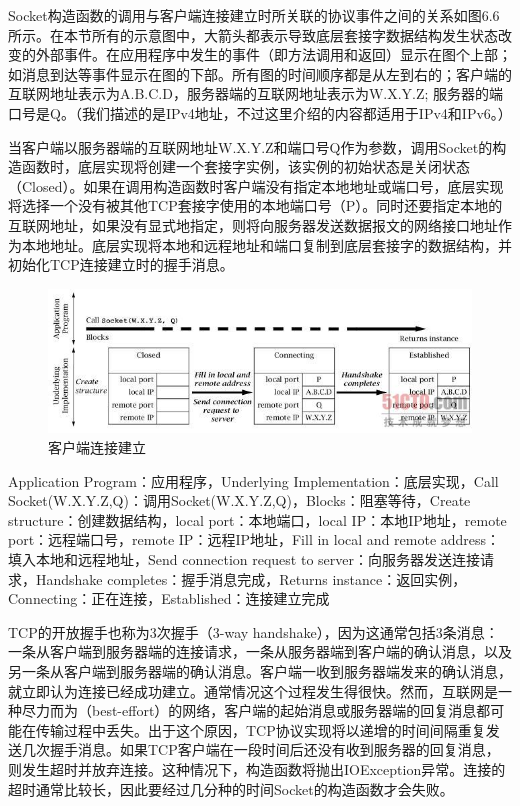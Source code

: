 		Socket构造函数的调用与客户端连接建立时所关联的协议事件之间的关系如图6.6所示。在本节所有的示意图中，大箭头都表示导致底层套接字数据结构发生状态改变的外部事件。在应用程序中发生的事件（即方法调用和返回）显示在图个上部；如消息到达等事件显示在图的下部。所有图的时间顺序都是从左到右的；客户端的互联网地址表示为A.B.C.D，服务器端的互联网地址表示为W.X.Y.Z; 服务器的端口号是Q。（我们描述的是IPv4地址，不过这里介绍的内容都适用于IPv4和IPv6。）

		当客户端以服务器端的互联网地址W.X.Y.Z和端口号Q作为参数，调用Socket的构造函数时，底层实现将创建一个套接字实例，该实例的初始状态是关闭状态（Closed）。如果在调用构造函数时客户端没有指定本地地址或端口号，底层实现将选择一个没有被其他TCP套接字使用的本地端口号（P）。同时还要指定本地的互联网地址，如果没有显式地指定，则将向服务器发送数据报文的网络接口地址作为本地地址。底层实现将本地和远程地址和端口复制到底层套接字的数据结构，并初始化TCP连接建立时的握手消息。

		\clearpage

		\begin{figure}[htbp]%
			\centering
			\includegraphics[scale=.6]{img/06.06.jpg}
			\caption{客户端连接建立}
			\label{fig:client.create.connection}
		\end{figure}

		Application Program：应用程序，Underlying Implementation：底层实现，Call Socket(W.X.Y.Z,Q)：调用Socket(W.X.Y.Z,Q)，Blocks：阻塞等待，Create structure：创建数据结构，local port：本地端口，local IP：本地IP地址，remote port：远程端口号，remote IP：远程IP地址，Fill in local and remote address：填入本地和远程地址，Send connection request to server：向服务器发送连接请求，Handshake completes：握手消息完成，Returns instance：返回实例，Connecting：正在连接，Established：连接建立完成

		TCP的开放握手也称为3次握手（3-way handshake），因为这通常包括3条消息：一条从客户端到服务器端的连接请求，一条从服务器端到客户端的确认消息，以及另一条从客户端到服务器端的确认消息。客户端一收到服务器端发来的确认消息，就立即认为连接已经成功建立。通常情况这个过程发生得很快。然而，互联网是一种尽力而为（best-effort）的网络，客户端的起始消息或服务器端的回复消息都可能在传输过程中丢失。出于这个原因，TCP协议实现将以递增的时间间隔重复发送几次握手消息。如果TCP客户端在一段时间后还没有收到服务器的回复消息，则发生超时并放弃连接。这种情况下，构造函数将抛出IOException异常。连接的超时通常比较长，因此要经过几分种的时间Socket的构造函数才会失败。


